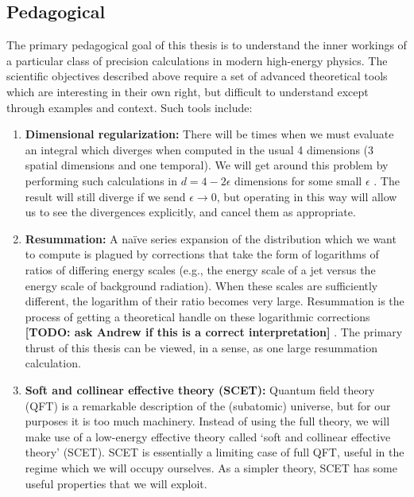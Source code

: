 \documentclass[../thesis.tex]{subfiles}
\begin{document}
\subsection{Pedagogical}
	The primary pedagogical goal of this thesis is to understand the inner workings of a particular class of precision calculations in modern high-energy physics. The scientific objectives described above require a set of advanced theoretical tools which are interesting in their own right, but difficult to understand except through examples and context. Such tools include:
	\begin{enumerate}
		\item \textbf{Dimensional regularization:} There will be times when we must evaluate an integral which diverges when computed in the usual 4 dimensions (3 spatial dimensions and one temporal). We will get around this problem by performing such calculations in $d = 4 - 2\epsilon$ dimensions for some small $\epsilon$ \cite{schwartz_quantum_2014}. The result will still diverge if we send $\epsilon \to 0$, but operating in this way will allow us to see the divergences explicitly, and cancel them as appropriate.

		\item \textbf{Resummation:} A na\"ive series expansion of the distribution which we want to compute is plagued by corrections that take the form of logarithms of ratios of differing energy scales (e.g., the energy scale of a jet versus the energy scale of background radiation). When these scales are sufficiently different, the logarithm of their ratio becomes very large. Resummation is the process of getting a theoretical handle on these logarithmic corrections {\color{red}\textbf{[TODO: ask Andrew if this is a correct interpretation]}} \cite{larkoski_elementary_2019-1}. The primary thrust of this thesis can be viewed, in a sense, as one large resummation calculation.

		\item \textbf{Soft and collinear effective theory (SCET):} Quantum field theory (QFT) is a remarkable description of the (subatomic) universe, but for our purposes it is too much machinery. Instead of using the full theory, we will make use of a low-energy effective theory called `soft and collinear effective theory' (SCET). SCET is essentially a limiting case of full QFT, useful in the regime which we will occupy ourselves. As a simpler theory, SCET has some useful properties that we will exploit.
	\end{enumerate}
\end{document}
